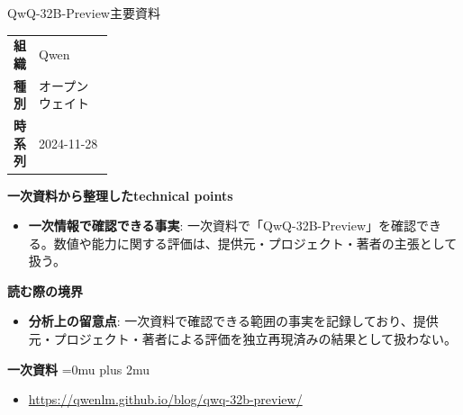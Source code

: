 \begin{technicalnote}{QwQ-32B-Preview}{主要資料}
\begingroup
\begin{tabularx}{\linewidth}{@{}>{\bfseries}p{0.22\linewidth}X@{}}
組織 & Qwen \\
種別 & オープンウェイト \\
時系列 & 2024-11-28 \\
\end{tabularx}
\smallskip
{\bfseries 一次資料から整理したtechnical points}
\begin{itemize}[leftmargin=1.5em,itemsep=0.35em]
\item \textbf{一次情報で確認できる事実}: 一次資料で「QwQ-32B-Preview」を確認できる。数値や能力に関する評価は、提供元・プロジェクト・著者の主張として扱う。
\end{itemize}
\begin{minipage}{\linewidth}
{\bfseries 読む際の境界}
\begin{itemize}[leftmargin=1.5em,itemsep=0.35em]
\item \textbf{分析上の留意点}: 一次資料で確認できる範囲の事実を記録しており、提供元・プロジェクト・著者による評価を独立再現済みの結果として扱わない。
\end{itemize}
\begin{samepage}
{\bfseries 一次資料}
\begingroup\sloppy
\Urlmuskip=0mu plus 2mu\relax
\begin{itemize}[leftmargin=1.5em,itemsep=0.25em]
\item {\scriptsize\url{https://qwenlm.github.io/blog/qwq-32b-preview/}}
\end{itemize}
\endgroup
\end{samepage}
\end{minipage}
\endgroup
\end{technicalnote}
\medskip

